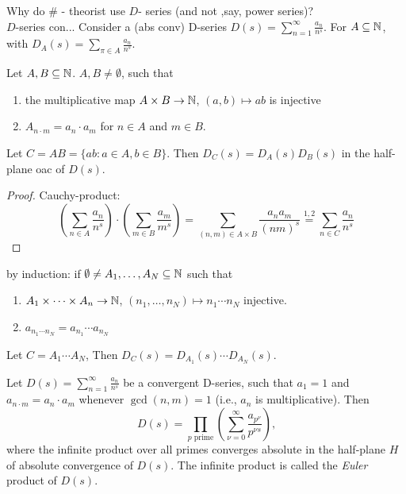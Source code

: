 \documentclass[NumTh.tex]{subfiles}
\begin{document}
Why do \# - theorist use $D$- series (and not ,say, power series)?\\
$D$-series con...
Consider a (abs conv) D-series $D(s) = \sum_{n=1}^\infty \frac{a_n}{n^s}$.
For $A \subseteq \mathbb{N}$, with $D_A(s) = \sum_{\pi \in A} \frac{a_n}{n^s}$.

\begin{lemma}\label{4_6}
  Let $A,B \subseteq \mathbb{N}$. $A,B \neq \emptyset$, such that
  \begin{enumerate}
    \item the multiplicative map $A \times B \to \mathbb{N}$, $(a,b) \mapsto ab$ is injective
    \item $A_{n \cdot m} = a_n \cdot a_m$ for $n \in A$ and $m \in B$.
  \end{enumerate}
  Let $C = AB = \{ ab : a \in A, b \in B \}$. Then $D_C(s) = D_A(s) D_B(s)$ in the half-plane oac of $D(s)$.
\end{lemma}

\begin{proof}
  Cauchy-product: 
  \[ \left( \sum_{n \in A} \frac{a_n}{n^s} \right) \cdot \left( \sum_{m \in B} \frac{a_m}{m^s} \right) = \sum_{(n,m) \in A \times B} \frac{a_n a_m}{(nm)^s} \overset{1,2}{=} \sum_{n \in C} \frac{a_n}{n^s} \]
\end{proof}

\begin{rem}
  by induction: if $\emptyset \neq A_1,\dots , A_N \subseteq \mathbb{N}$ such that
  \begin{enumerate}
    \item $A_1 \times \dots \times A_n \to \mathbb{N}$, $(n_1,\dots,n_N) \mapsto n_1 \cdots n_N$ injective.
    \item $a_{n_1 \cdots n_N} = a_{n_1} \cdots a_{n_N}$
  \end{enumerate}
  Let $C = A_1 \cdots A_N$, Then $D_C(s) = D_{A_1}(s) \cdots D_{A_N}(s)$.
\end{rem}

\begin{theorem}\label{4_7}
  Let $D(s) = \sum_{n=1}^\infty \frac{a_n}{n^s}$ be a convergent D-series, such that $a_1 = 1$ and $a_{n \cdot m} = a_n \cdot a_m$ whenever $\gcd(n,m) = 1$ (i.e., $a_n$ is multiplicative).
  Then 
  \[ D(s) = \prod_{p \text{ prime}} \left( \sum_{\nu = 0}^\infty \frac{a_{p^\nu}}{p^{\nu s}} \right) \text{,} \]
  where the infinite product over all primes converges absolute in the half-plane $H$ of absolute convergence of $D(s)$.
  The infinite product is called the \emph{Euler} product of $D(s)$.
\end{theorem}
\end{document}
